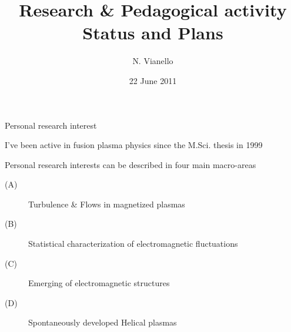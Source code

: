 \documentclass[t,10pt]{beamer}
\title{Research \& Pedagogical activity \\
{\small Status and Plans}}
\author{N. Vianello }
\date{22 June 2011}
\begin{document}
\begin{titleframe}
\end{titleframe}

\begin{frame}{Personal research interest}
\begin{itemize}
{\large\item I've been active in fusion plasma physics since the
M.Sci. thesis in 1999
\item Personal research interests can be described in four main
  macro-areas
\begin{description}
\item[(A)] \textcolor{taorange}{Turbulence \& Flows in magnetized plasmas}
\item[(B)] \textcolor{ta3skyblue}{Statistical characterization of
    electromagnetic fluctuations}
\item[(C)]\textcolor{ta3chameleon}{Emerging of electromagnetic structures}
\item[(D)] \textcolor{tascarletred}{Spontaneously developed Helical plasmas}
\end{description}
}\end{itemize}
\end{frame}
\end{document}
